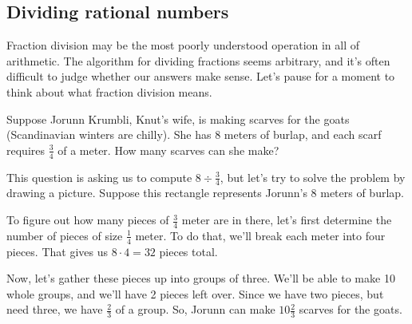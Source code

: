 \subsection{Dividing rational numbers}

Fraction division may be the most poorly understood operation in all of arithmetic. The algorithm for dividing fractions seems arbitrary, and it's often difficult to judge whether our answers make sense. Let's pause for a moment to think about what fraction division means.

Suppose Jorunn Krumbli, Knut's wife, is making scarves for the goats (Scandinavian winters are chilly). She has 8 meters of burlap, and each scarf requires $\frac{3}{4}$ of a meter. How many scarves can she make?


This question is asking us to compute $8 \div \frac{3}{4}$, but let's try to solve the problem by drawing a picture. Suppose this rectangle represents Jorunn's 8 meters of burlap.
\begin{center}
\end{center}

To figure out how many pieces of $\frac{3}{4}$ meter are in there, let's first determine the number of pieces of size $\frac{1}{4}$ meter. To do that, we'll break each meter into four pieces. That gives us $8 \cdot 4 = 32$ pieces total.
\begin{center}
\end{center}

Now, let's gather these pieces up into groups of three. We'll be able to make 10 whole groups, and we'll have 2 pieces left over. Since we have two pieces, but need three, we have $\frac{2}{3}$ of a group. So, Jorunn can make $10\frac{2}{3}$ scarves for the goats.
\begin{center}
\end{center}

